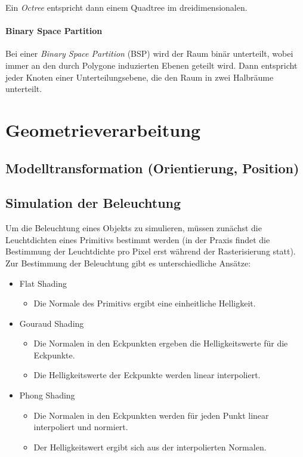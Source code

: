 \documentclass[a4paper, 11pt, accentcolor = tud3b]{tudreport}
\begin{document}
						Ein \emph{Octree} entspricht dann einem Quadtree im dreidimensionalen.
	
					\paragraph{Binary Space Partition}
						Bei einer \emph{Binary Space Partition} (BSP) wird der Raum binär unterteilt, wobei immer an den durch Polygone induzierten Ebenen geteilt wird. Dann entspricht jeder Knoten einer Unterteilungsebene, die den Raum in zwei Halbräume unterteilt.

		\section{Geometrieverarbeitung}
			\subsection{Modelltransformation (Orientierung, Position)} %

			\subsection{Simulation der Beleuchtung}
				Um die Beleuchtung eines Objekts zu simulieren, müssen zunächst die Leuchtdichten eines Primitivs bestimmt werden (in der Praxis findet die Bestimmung der Leuchtdichte pro Pixel erst während der Rasterisierung statt). Zur Bestimmung der Beleuchtung gibt es unterschiedliche Ansätze:
				\begin{itemize}
					\item Flat Shading
						\begin{itemize}
							\item Die Normale des Primitivs ergibt eine einheitliche Helligkeit.
						\end{itemize}
					\item Gouraud Shading
						\begin{itemize}
							\item Die Normalen in den Eckpunkten ergeben die Helligkeitswerte für die Eckpunkte.
							\item Die Helligkeitswerte der Eckpunkte werden linear interpoliert.
						\end{itemize}
					\item Phong Shading
						\begin{itemize}
							\item Die Normalen in den Eckpunkten werden für jeden Punkt linear interpoliert und normiert.
							\item Der Helligkeitswert ergibt sich aus der interpolierten Normalen.
						\end{itemize}
				\end{itemize}
\end{document}
